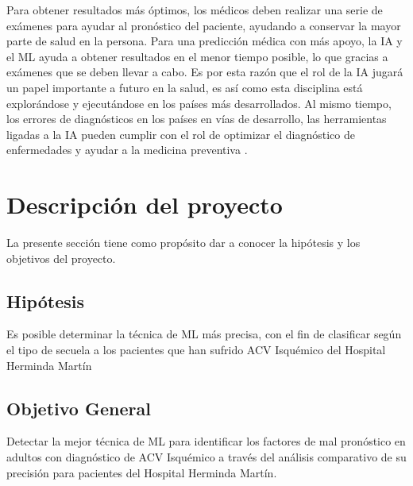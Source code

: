 \par Para obtener resultados más óptimos, los médicos deben realizar una serie de exámenes para ayudar al pronóstico del paciente, ayudando a conservar la mayor parte de salud en la persona. Para una predicción médica con más apoyo, la IA y el ML ayuda a obtener resultados en el menor tiempo posible, lo que gracias a exámenes que se deben llevar a cabo. Es por esta razón que el rol de la IA jugará un papel importante a futuro en la salud, es así como esta disciplina está explorándose y ejecutándose en los países más desarrollados. Al mismo tiempo, los errores de diagnósticos en los países en vías de desarrollo, las herramientas ligadas a la IA pueden cumplir con el rol de optimizar el diagnóstico de enfermedades y ayudar a la medicina preventiva \cite{Curioso2020}.\\


\doublespacing
\section{Descripción del proyecto}
La presente sección tiene como propósito dar a conocer la hipótesis y los objetivos del proyecto.\\

\doublespacing
\subsection{Hipótesis}
Es posible determinar la técnica de ML más precisa, con el fin de clasificar según el tipo de secuela a los pacientes que han sufrido ACV Isquémico del Hospital Herminda Martín\\

\doublespacing
\subsection{Objetivo General}
Detectar la mejor técnica de ML para identificar los factores de mal pronóstico en adultos con diagnóstico de ACV Isquémico a través del análisis comparativo de su precisión para pacientes del Hospital Herminda Martín.\\

\doublespacing
